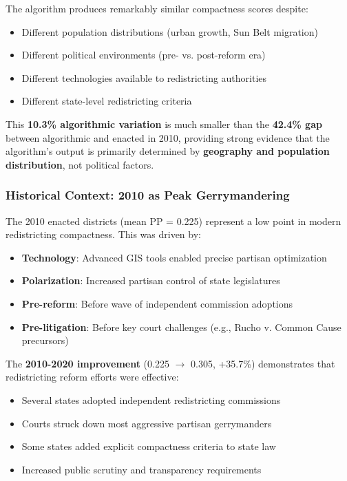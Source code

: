 The algorithm produces remarkably similar compactness scores despite:
\begin{itemize}
\item Different population distributions (urban growth, Sun Belt migration)
\item Different political environments (pre- vs. post-reform era)
\item Different technologies available to redistricting authorities
\item Different state-level redistricting criteria
\end{itemize}

This \textbf{10.3\% algorithmic variation} is much smaller than the \textbf{42.4\% gap} between algorithmic and enacted in 2010, providing strong evidence that the algorithm's output is primarily determined by \textbf{geography and population distribution}, not political factors.

\subsubsection{Historical Context: 2010 as Peak Gerrymandering}

The 2010 enacted districts (mean PP = 0.225) represent a low point in modern redistricting compactness. This was driven by:

\begin{itemize}
\item \textbf{Technology}: Advanced GIS tools enabled precise partisan optimization
\item \textbf{Polarization}: Increased partisan control of state legislatures
\item \textbf{Pre-reform}: Before wave of independent commission adoptions
\item \textbf{Pre-litigation}: Before key court challenges (e.g., Rucho v. Common Cause precursors)
\end{itemize}

The \textbf{2010-2020 improvement} (0.225 $\rightarrow$ 0.305, +35.7\%) demonstrates that redistricting reform efforts were effective:

\begin{itemize}
\item Several states adopted independent redistricting commissions
\item Courts struck down most aggressive partisan gerrymanders
\item Some states added explicit compactness criteria to state law
\item Increased public scrutiny and transparency requirements
\end{itemize}


